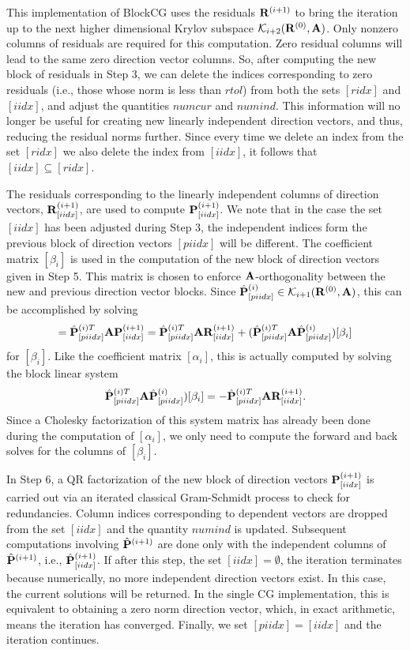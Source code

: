 \documentclass{article}
\newcommand{\bA}{{\bf A}}
\newcommand{\bP}{{\bf P}}
\newcommand{\bR}{{\bf R}}
\newcommand{\dm}{\begin{displaymath}}
\newcommand{\edm}{\end{displaymath}}
\begin{document}
This implementation of BlockCG uses the residuals $\bR^{(i+1)}$ to
bring the iteration up to the next higher dimensional Krylov
subspace ${\cal K}_{i+2}(\bR^{(0)}, \bA)$. Only nonzero columns of
residuals are required for this computation. Zero residual columns
will lead to the same zero direction vector columns. So, after
computing the new block of residuals in Step 3, we can delete the
indices corresponding to zero residuals (i.e., those whose norm is
less than $rtol$) from both the sets $[ridx]$ and $[iidx]$, and
adjust the quantities $numcur$ and $numind$. This information will
no longer be useful for creating new linearly independent
direction vectors, and thus, reducing the residual norms further.
Since every time we delete an index from the set $[ridx]$ we also
delete the index from $[iidx]$, it follows that $[iidx] \subseteq
[ridx]$.

The residuals corresponding to the linearly independent columns of
direction vectors, $\bR^{(i+1)}_{[iidx]}$, are used to compute
$\bP^{(i+1)}_{[iidx]}$. We note that in the case the set $[iidx]$
has been adjusted during Step 3, the independent indices form the
previous block of direction vectors $[piidx]$ will be different.
The coefficient matrix $[\beta_i]$ is used in the computation of
the new block of direction vectors given in Step 5. This matrix is
chosen to enforce $\bA$-orthogonality between the new and previous
direction vector blocks. Since ${\hat \bP}^{(i)}_{[piidx]} \in
{\cal K}_{i+1}(\bR^{(0)}, \bA)$, this can be accomplished by
solving
 \dm
 [ {\bf 0} ] = {\hat \bP}^{(i)T}_{[piidx]} \bA \bP^{(i+1)}_{[iidx]} =
   {\hat \bP}^{(i)T}_{[piidx]} \bA \bR^{(i+1)}_{[iidx]}
  + ( {\hat \bP}^{(i)T}_{[piidx]} \bA {\hat \bP}^{(i)}_{[piidx]})
 [ \beta_i ]
 \edm
for $[\beta_i]$. Like the coefficient matrix $[\alpha_i]$, this is
actually computed by solving the block linear system
 \dm
  {\hat \bP}^{(i)T}_{[piidx]} \bA {\hat \bP}^{(i)}_{[piidx]})
 [ \beta_i ] = -{\hat \bP}^{(i)T}_{[piidx]} \bA \bR^{(i+1)}_{[iidx]}.
 \edm
Since a Cholesky factorization of this system matrix has already
been done during the computation of $[\alpha_i]$, we only need to
compute the forward and back solves for the columns of
$[\beta_i]$.

In Step 6, a QR factorization of the new block of direction
vectors $\bP^{(i+1)}_{[iidx]}$ is carried out via an iterated
classical Gram-Schmidt process to check for redundancies. Column
indices corresponding to dependent vectors are dropped from the
set $[iidx]$ and the quantity $numind$ is updated. Subsequent
computations involving ${\hat \bP}^{(i+1)}$ are done only with the
independent columns of ${\hat \bP}^{(i+1)}$, i.e., ${\hat
\bP}^{(i+1)}_{[iidx]}$. If after this step, the set $[iidx] =
\emptyset$, the iteration terminates because numerically, no more
independent direction vectors exist. In this case, the current
solutions will be returned. In the single CG implementation, this
is equivalent to obtaining a zero norm direction vector, which, in
exact arithmetic, means the iteration has converged. Finally, we
set $[piidx] = [iidx]$ and the iteration continues.
\end{document}
